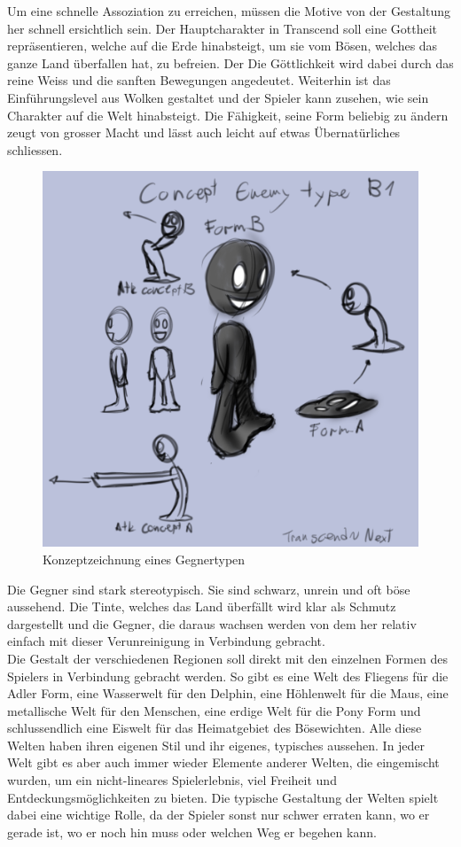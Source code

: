 \documentclass[12pt,a4paper,titlepage]{article}
\begin{document}
		Um eine schnelle Assoziation zu erreichen, müssen die Motive von der Gestaltung her schnell ersichtlich sein. Der Hauptcharakter in Transcend soll eine Gottheit repräsentieren, welche auf die Erde hinabsteigt, um sie vom Bösen, welches das ganze Land überfallen hat, zu befreien. Der Die Göttlichkeit wird dabei durch das reine Weiss und die sanften Bewegungen angedeutet. Weiterhin ist das Einführungslevel aus Wolken gestaltet und der Spieler kann zusehen, wie sein Charakter auf die Welt hinabsteigt. Die Fähigkeit, seine Form beliebig zu ändern zeugt von grosser Macht und lässt auch leicht auf etwas Übernatürliches schliessen.\\
		\begin{figure}
  			\centering
			\includegraphics[keepaspectratio=true,scale=0.4]{enemy1concept.png}
  			\caption{Konzeptzeichnung eines Gegnertypen}
		\end{figure}
		Die Gegner sind stark stereotypisch. Sie sind schwarz, unrein und oft böse aussehend. Die Tinte, welches das Land überfällt wird klar als Schmutz dargestellt und die Gegner, die daraus wachsen werden von dem her relativ einfach mit dieser Verunreinigung in Verbindung gebracht.\\
		
		Die Gestalt der verschiedenen Regionen soll direkt mit den einzelnen Formen des Spielers in Verbindung gebracht werden. So gibt es eine Welt des Fliegens für die Adler Form, eine Wasserwelt für den Delphin, eine Höhlenwelt für die Maus, eine metallische Welt für den Menschen, eine erdige Welt für die Pony Form und schlussendlich eine Eiswelt für das Heimatgebiet des Bösewichten. Alle diese Welten haben ihren eigenen Stil und ihr eigenes, typisches aussehen. In jeder Welt gibt es aber auch immer wieder Elemente anderer Welten, die eingemischt wurden, um ein nicht-lineares Spielerlebnis, viel Freiheit und Entdeckungsmöglichkeiten zu bieten. Die typische Gestaltung der Welten spielt dabei eine wichtige Rolle, da der Spieler sonst nur schwer erraten kann, wo er gerade ist, wo er noch hin muss oder welchen Weg er begehen kann.
		
\end{document}
